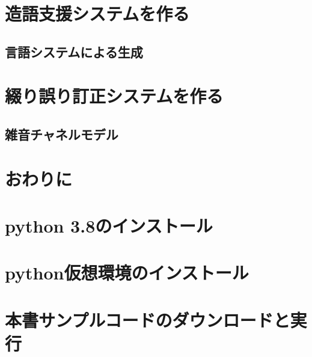 \documentclass[11pt]{report}
\begin{document}
\chapter{造語支援システムを作る}

\section{言語システムによる生成}

\chapter{綴り誤り訂正システムを作る}

\section{雑音チャネルモデル}

\chapter{おわりに}

\appendix
\def\thesection{補遺\Alph{section}}

\chapter{python 3.8のインストール}

\chapter{python仮想環境のインストール}

\chapter{本書サンプルコードのダウンロードと実行}
\end{document}
